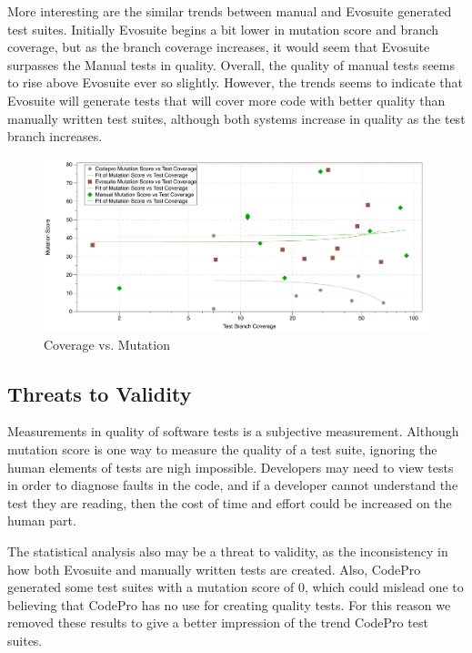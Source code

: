 \documentclass[conference]{IEEEtran}
\begin{document}
More interesting are the similar trends between manual and Evosuite generated test suites. Initially Evosuite begins a bit lower in mutation score and branch coverage, but as the branch coverage increases, it would seem that Evosuite surpasses the Manual tests in quality. Overall, the quality of manual tests seems to rise above Evosuite ever so slightly. However, the trends seems to indicate that Evosuite will generate tests that will cover more code with better quality than manually written test suites, although both systems increase in quality as the test branch increases.

\begin{figure}[!t]
\centering
  \includegraphics[width=\textwidth]{Coverage_Mutation}
    \caption{Coverage vs. Mutation}
  \label{fig:Coverage_Mutation}
\end{figure}


\subsection{Threats to Validity}
Measurements in quality of software tests is a subjective measurement. Although mutation score is one way to measure the quality of a test suite, ignoring the human elements of tests are nigh impossible. Developers may need to view tests in order to diagnose faults in the code, and if a developer cannot understand the test they are reading, then the cost of time and effort could be increased on the human part.

The statistical analysis also may be a threat to validity, as the inconsistency in how both Evosuite and manually written tests are created. Also, CodePro generated some test suites with a mutation score of 0, which could mislead one to believing that CodePro has no use for creating quality tests. For this reason we removed these results to give a better impression of the trend CodePro test suites.

\end{document}
